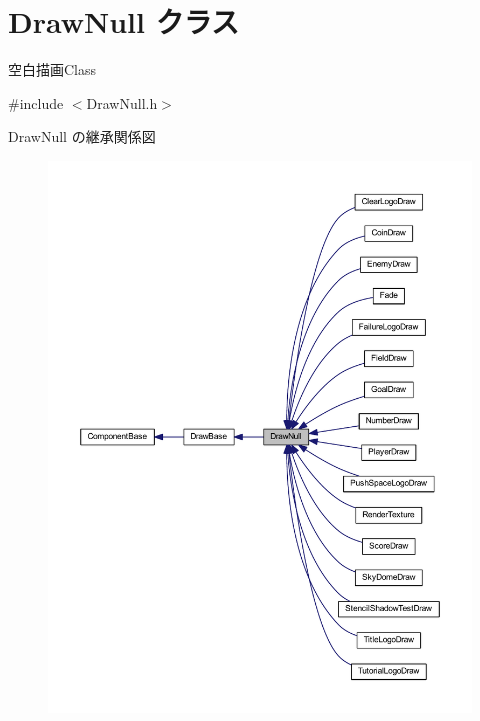 \hypertarget{class_draw_null}{}\section{Draw\+Null クラス}
\label{class_draw_null}


空白描画\+Class  




{\ttfamily \#include $<$Draw\+Null.\+h$>$}



Draw\+Null の継承関係図\nopagebreak
\begin{figure}[H]
\begin{center}
\leavevmode
\includegraphics[width=350pt]{class_draw_null__inherit__graph}
\end{center}
\end{figure}
